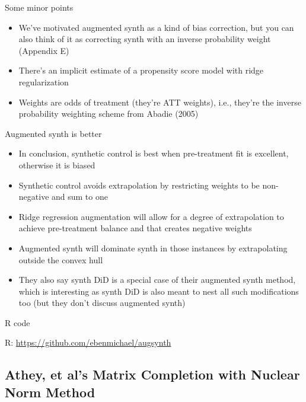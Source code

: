 \documentclass{beamer}
\begin{document}
\begin{frame}{Some minor points}

\begin{itemize}
\item We've motivated augmented synth as a kind of bias correction, but you can also think of it as correcting synth with an inverse probability weight (Appendix E)
\item There's an implicit estimate of a propensity score model with ridge regularization
\item Weights are odds of treatment (they're ATT weights), i.e., they're the inverse probability weighting scheme from Abadie (2005)
\end{itemize}

\end{frame}


\begin{frame}{Augmented synth is better}

\begin{itemize}
\item In conclusion, synthetic control is best when pre-treatment fit is excellent, otherwise it is biased
\item Synthetic control avoids extrapolation by restricting weights to be non-negative and sum to one
\item Ridge regression augmentation will allow for a degree of extrapolation to achieve pre-treatment balance and that creates negative weights
\item Augmented synth will dominate synth in those instances by extrapolating outside the convex hull
\item They also say synth DiD is a special case of their augmented synth method, which is interesting as synth DiD is also meant to nest all such modifications too (but they don't discuss augmented synth)
\end{itemize}

\end{frame}



\begin{frame}{R code}

R: \url{https://github.com/ebenmichael/augsynth}

\end{frame}



\subsection{Athey, et al's Matrix Completion with Nuclear Norm Method}
\end{document}
